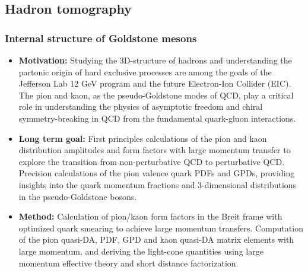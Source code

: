 \documentclass[12pt,hyperpdf]{article}
\begin{document}
\subsection{Hadron tomography}

\subsubsection{Internal structure of Goldstone mesons}
\begin{itemize}
    \item{\bf Motivation:} Studying the 3D-structure of hadrons and understanding the partonic origin of hard exclusive processes are among the goals of the Jefferson Lab 12 GeV program and the future Electron-Ion Collider (EIC). The pion and kaon, as the pseudo-Goldstone modes of QCD, play a critical role in understanding the physics of asymptotic freedom and chiral symmetry-breaking in QCD from the fundamental quark-gluon interactions.
    
    \item{\bf Long term goal:} First principles calculations of the pion and kaon distribution amplitudes and form factors with large momentum transfer to explore the transition from non-perturbative QCD to perturbative QCD. Precision calculations of the pion valence quark PDFs and GPDs, providing insights into the quark momentum fractions and 3-dimensional distributions in the pseudo-Goldstone bosons.
    
    \item{\bf Method:} Calculation of pion/kaon form factors in the Breit frame with optimized quark smearing to achieve large momentum transfers. Computation of the pion quasi-DA, PDF, GPD and kaon quasi-DA matrix elements with large momentum, and deriving the light-cone quantities using large momentum effective theory and short distance factorization.
      

\end{itemize}
\end{document}
